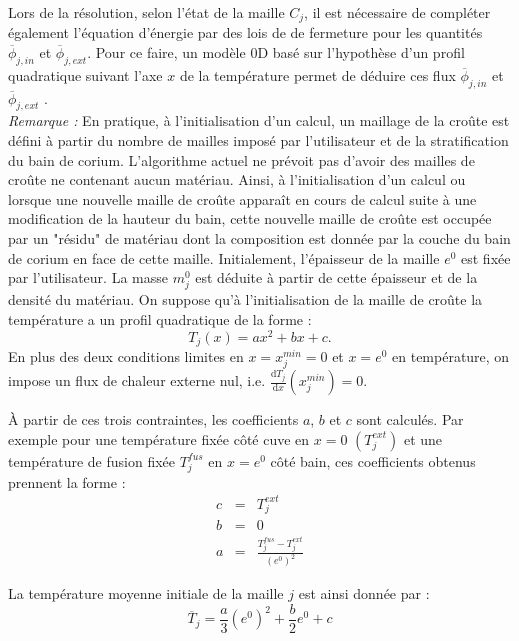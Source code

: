 Lors de la résolution, selon l'état de la maille $C_j$, il est nécessaire de compléter également l'équation d'énergie par des lois de de fermeture pour les quantités $\overline{\phi}_{j,in}$ et $\overline{\phi}_{j,ext}$. Pour ce faire, un modèle 0D basé sur l'hypothèse d'un profil quadratique suivant l'axe $x$ de la température permet de déduire ces flux $\overline{\phi}_{j,in}$ et $\overline{\phi}_{j,ext}$ \cite{LeTellier2016}.\\

{\it Remarque :}
En pratique, à l'initialisation d'un calcul, un maillage de la croûte est défini à partir du nombre de mailles imposé par l'utilisateur et de la stratification du bain de corium. L'algorithme actuel ne prévoit pas d'avoir des mailles de croûte ne contenant aucun matériau. Ainsi, à l'initialisation d'un calcul ou lorsque une nouvelle maille de croûte apparaît en cours de calcul suite à une modification de la hauteur du bain, cette nouvelle maille de croûte est occupée par un "résidu" de matériau dont la composition est donnée par la couche du bain de corium en face de cette maille. Initialement, l'épaisseur de la maille $e^0$ est fixée par l'utilisateur. La masse $m_j^0$ est déduite à partir de cette épaisseur et de la densité du matériau. On suppose qu'à l'initialisation de la maille de croûte la température a un profil quadratique de la forme : 
$$T_j(x)=ax^2+bx+c.$$
En plus des deux conditions limites en $x=x_j^{min}=0$ et $x=e^0$ en température, on impose un flux de chaleur externe nul, i.e. $\frac{\mathrm{d}T_j}{\mathrm{d}x}(x_j^{min}) = 0$.

À partir de ces trois contraintes, les coefficients $a$, $b$ et $c$ sont calculés. Par exemple pour une température fixée côté cuve en $x=0$ $(T_j^{ext})$ et une température de fusion fixée $T_j^{fus}$ en $x=e^0$ côté bain, ces coefficients obtenus prennent la forme :
\begin{eqnarray*}
c &=& T^{ext}_j \\
b &=& 0 \\
a &=& \frac{T_j^{fus}-T^{ext}_j}{({e^0})^2}
\end{eqnarray*}

La température moyenne initiale de la maille $j$ est ainsi donnée par :
$$\overline{T}_{j}=\frac{a}{3} ({e^0})^2 + \frac{b}{2} e^0 + c$$
